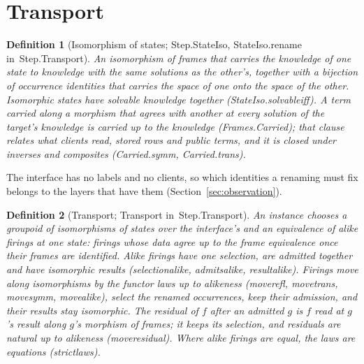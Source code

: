 \documentclass[11pt]{article}
\newtheorem{definition}{Definition}
\theoremstyle{remark}
\newcommand{\lean}[1]{{\ttfamily\def\_{\textunderscore\allowbreak}#1}}
\newcommand{\inmod}[1]{in~{\ttfamily\def\_{\textunderscore\allowbreak}#1}}
\begin{document}
\section{Transport}\label{sec:transport}

\begin{definition}[Isomorphism of states; \lean{Step.StateIso}, \lean{StateIso.rename} \inmod{Step.Transport}]
An isomorphism of frames that carries the knowledge of one state to knowledge with the same solutions
as the other's, together with a bijection of occurrence identities that carries the space of one onto
the space of the other. Isomorphic states have solvable knowledge together (\lean{StateIso.solvable\_iff}).
A term carried along a morphism that agrees with another at every solution of the target's knowledge
is \emph{carried up to the knowledge} (\lean{Frames.Carried}); that clause relates what clients read,
stored rows and public terms, and it is closed under inverses and composites (\lean{Carried.symm},
\lean{Carried.trans}).
\end{definition}

The interface has no labels and no clients, so which identities a renaming must fix belongs to the
layers that have them (Section~\ref{sec:observation}).

\begin{definition}[Transport; \lean{Transport} \inmod{Step.Transport}]
An instance chooses a groupoid of isomorphisms of states over the interface's and an equivalence of
\emph{alike} firings at one state: firings whose data agree up to the frame equivalence once their
frames are identified. Alike firings have one selection, are admitted together and have isomorphic
results (\lean{selection\_alike}, \lean{admits\_alike}, \lean{result\_alike}). Firings move along isomorphisms
by the functor laws up to alikeness (\lean{move\_refl}, \lean{move\_trans}, \lean{move\_symm}, \lean{move\_alike}),
select the renamed occurrences, keep their admission, and their results stay isomorphic. The
\emph{residual} of $f$ after an admitted $g$ is $f$ read at $g$'s result along $g$'s morphism of frames; it
keeps its selection, and residuals are natural up to alikeness (\lean{move\_residual}). Where alike
firings are equal, the laws are equations (\lean{strict\_laws}).
\end{definition}
\end{document}
